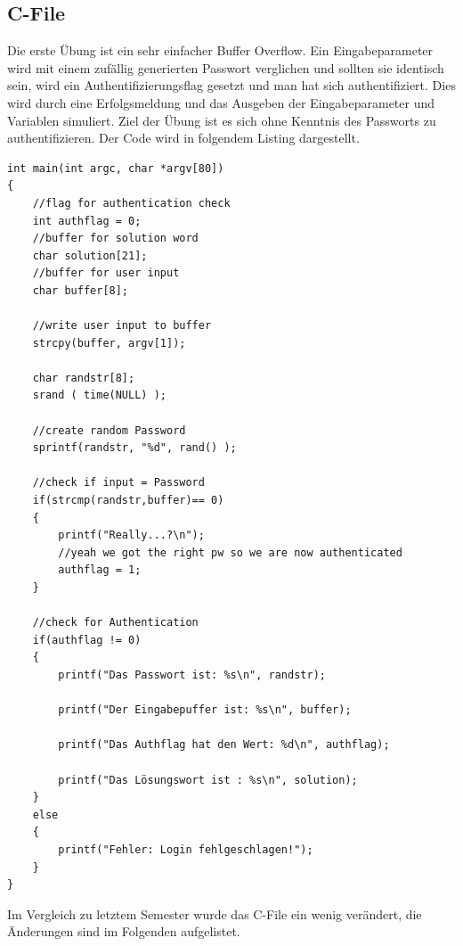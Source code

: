 \subsection{C-File}
Die erste Übung ist ein sehr einfacher Buffer Overflow. Ein Eingabeparameter wird mit einem zufällig generierten Passwort verglichen und sollten sie identisch sein, wird ein Authentifizierungsflag gesetzt und man hat sich \glqq{}authentifiziert\grqq{}. Dies wird durch eine Erfolgsmeldung und das Ausgeben der Eingabeparameter und Variablen simuliert. Ziel der Übung ist es sich ohne Kenntnis des Passworts zu authentifizieren.
Der Code wird in folgendem Listing dargestellt.

\begin{lstlisting}
int main(int argc, char *argv[80])
{
    //flag for authentication check
    int authflag = 0;
    //buffer for solution word
    char solution[21];
    //buffer for user input
    char buffer[8];

    //write user input to buffer
    strcpy(buffer, argv[1]);

    char randstr[8];
    srand ( time(NULL) );

    //create random Password
    sprintf(randstr, "%d", rand() );

    //check if input = Password
    if(strcmp(randstr,buffer)== 0)
    {
        printf("Really...?\n");
        //yeah we got the right pw so we are now authenticated
        authflag = 1;
    }

    //check for Authentication
    if(authflag != 0)
    {
        printf("Das Passwort ist: %s\n", randstr);

        printf("Der Eingabepuffer ist: %s\n", buffer);

        printf("Das Authflag hat den Wert: %d\n", authflag);

        printf("Das Lösungswort ist : %s\n", solution);
    }
    else
    {
        printf("Fehler: Login fehlgeschlagen!");
    }
}
\end{lstlisting}
Im Vergleich zu letztem Semester wurde das C-File ein wenig verändert, die Änderungen sind im Folgenden aufgelistet.
